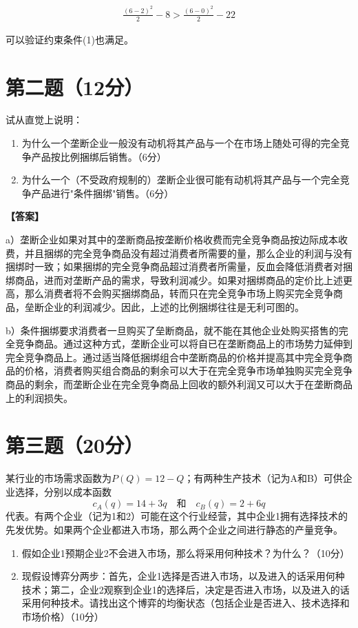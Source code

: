 \documentclass[12pt]{article}
\begin{document}
$$\begin{aligned}\frac{(6-2)^2}{2}-8>\frac{(6-0)^2}{2}-22\end{aligned}$$

可以验证约束条件(1)也满足。

\section*{第二题（12分）}
试从直觉上说明：

\begin{enumerate}
\item 为什么一个垄断企业一般没有动机将其产品与一个在市场上随处可得的完全竞争产品按比例捆绑后销售。（6分）

\item 为什么一个（不受政府规制的）垄断企业很可能有动机将其产品与一个完全竞争产品进行"条件捆绑"销售。（6分）
\end{enumerate}

\noindent\textbf{【答案】}

a）垄断企业如果对其中的垄断商品按垄断价格收费而完全竞争商品按边际成本收费，并且捆绑的完全竞争商品没有超过消费者所需要的量，那么企业的利润与没有捆绑时一致；如果捆绑的完全竞争商品超过消费者所需量，反血会降低消费者对捆绑商品，进而对垄断产品的需求，导致利润减少。如果对捆绑商品的定价比上述更高，那么消费者将不会购买捆绑商品，转而只在完全竞争市场上购买完全竞争商品，垒断企业的利润减少。因此，上述的比例捆绑往往是无利可图的。

b）条件捆绑要求消费者一旦购买了垒断商品，就不能在其他企业处购买搭售的完全竞争商品。通过这种方式，垄断企业可以将自已在垄断商品上的市场势力延伸到完全竞争商品上。通过适当降低捆绑组合中垄断商品的价格并提高其中完全竞争商品的价格，消费者购买组合商品的剩余可以大于在完全竞争市场单独购买完全竞争商品的剩余，而垄断企业在完全竞争商品上回收的额外利润又可以大于在垄断商品上的利润损失。

\section*{第三题（20分）}
某行业的市场需求函数为$P(Q)=12-Q$；有两种生产技术（记为A和B）可供企业选择，分别以成本函数
$$c_A(q)=14+3q\quad\text{和}\quad c_B(q)=2+6q$$
代表。有两个企业（记为1和2）可能在这个行业经营，其中企业1拥有选择技术的先发优势。如果两个企业都进入市场，那么两个企业之间进行静态的产量竞争。

\begin{enumerate}
\item 假如企业1预期企业2不会进入市场，那么将采用何种技术？为什么？（10分）

\item 现假设博弈分两步：首先，企业1选择是否进入市场，以及进入的话采用何种技术；第二，企业2观察到企业1的选择后，决定是否进入市场，以及进入的话采用何种技术。请找出这个博弈的均衡状态（包括企业是否进入、技术选择和市场价格）（10分）
\end{enumerate}
\end{document}
